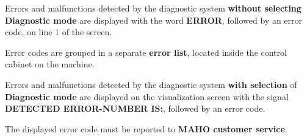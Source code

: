 Errors and malfunctions detected by the diagnostic system \textbf{without selecting} \textbf{Diagnostic mode} are displayed with the word \textbf{ERROR}, followed by an error code, on line 1 of the screen.

Error codes are grouped in a separate \textbf{error list}, located inside the control cabinet on the machine.

Errors and malfunctions detected by the diagnostic system \textbf{with selection} of \textbf{Diagnostic mode} are displayed on the visualization screen with the signal \textbf{DETECTED ERROR-NUMBER IS:}, followed by an error code.

The displayed error code must be reported to \textbf{MAHO customer service}.
